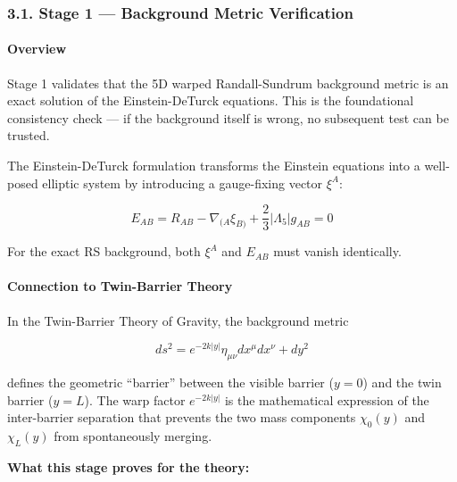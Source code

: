 \documentclass[
  11pt,
]{article}
\begin{document}
\hypertarget{stage-1-background-metric-verification}{%
\subsubsection{3.1. Stage 1 --- Background Metric
Verification}\label{stage-1-background-metric-verification}}

\hypertarget{overview}{%
\paragraph{Overview}\label{overview}}

Stage 1 validates that the 5D warped Randall-Sundrum background metric
is an exact solution of the Einstein-DeTurck equations. This is the
foundational consistency check --- if the background itself is wrong, no
subsequent test can be trusted.

The Einstein-DeTurck formulation transforms the Einstein equations into
a well-posed elliptic system by introducing a gauge-fixing vector
\(\xi^A\):

\[E_{AB} = R_{AB} - \nabla_{(A}\xi_{B)} + \frac{2}{3}|\Lambda_5| g_{AB} = 0 \tag{99}\]

For the exact RS background, both \(\xi^A\) and \(E_{AB}\) must vanish
identically.

\bigskip

\hypertarget{connection-to-twin-barrier-theory}{%
\paragraph{Connection to Twin-Barrier
Theory}\label{connection-to-twin-barrier-theory}}

In the Twin-Barrier Theory of Gravity, the background metric

\[ds^2 = e^{-2k|y|}\eta_{\mu\nu}dx^\mu dx^\nu + dy^2 \tag{100}\]

defines the geometric ``barrier'' between the visible barrier
(\(y = 0\)) and the twin barrier (\(y = L\)). The warp factor
\(e^{-2k|y|}\) is the mathematical expression of the inter-barrier
separation that prevents the two mass components \(\chi_0(y)\) and
\(\chi_L(y)\) from spontaneously merging.

\textbf{What this stage proves for the theory:}
\end{document}
